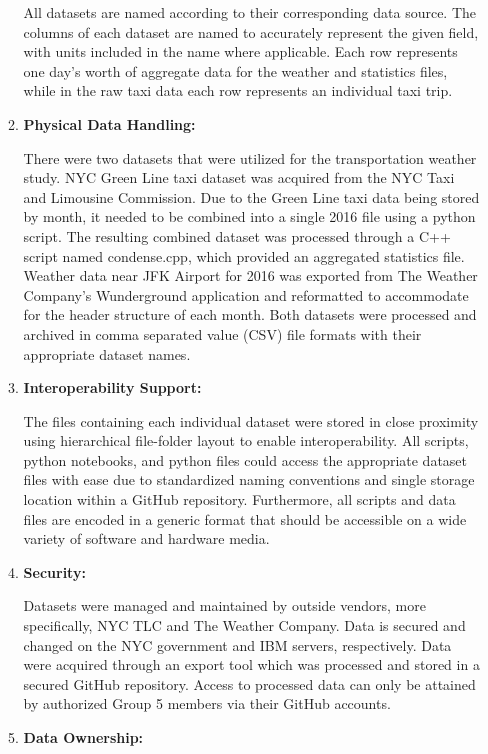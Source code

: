 \documentclass{article}
\begin{document}
\begin{enumerate}
\begin{enumerate}
        All datasets are named according to their corresponding data source. The columns of each dataset are named to accurately represent the given field, with units included in the name where applicable. Each row represents one day's worth of aggregate data for the weather and statistics files, while in the raw taxi data each row represents an individual taxi trip.


        \item
        \textbf{Physical Data Handling:}

        There were two datasets that were utilized for the transportation weather study. NYC Green Line taxi dataset was acquired from the NYC Taxi and Limousine Commission. Due to the Green Line taxi data being stored by month, it needed to be combined into a single 2016 file using a python script. The resulting combined dataset was processed through a C++ script named condense.cpp, which provided an aggregated statistics file. Weather data near JFK Airport for 2016 was exported from The Weather Company’s Wunderground application and reformatted to accommodate for the header structure of each month. Both datasets were processed and archived in comma separated value (CSV) file formats with their appropriate dataset names.


        \item
        \textbf{Interoperability Support:}

        The files containing each individual dataset were stored in close proximity using hierarchical file-folder layout to enable interoperability. All scripts, python notebooks, and python files could access the appropriate dataset files with ease due to standardized naming conventions and single storage location within a GitHub repository. Furthermore, all scripts and data files are encoded in a generic format that should be accessible on a wide variety of software and hardware media.


        \item
        \textbf{Security:}

        Datasets were managed and maintained by outside vendors, more specifically, NYC TLC and The Weather Company. Data is secured and changed on the NYC government and IBM servers, respectively. Data were acquired through an export tool which was processed and stored in a secured GitHub repository. Access to processed data can only be attained by authorized Group 5 members via their GitHub accounts.


        \item
        \textbf{Data Ownership:}


\end{enumerate}
\end{enumerate}
\end{document}
